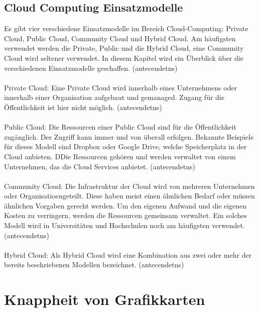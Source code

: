\documentclass[12pt,toc=bib,toc=listof]{scrreprt}
\begin{document}
\section{Cloud Computing Einsatzmodelle} %
\label{sec:Cloud Computing Einsatzmodelle}

Es gibt vier verschiedene Einsatzmodelle im Bereich Cloud-Computing: Private Cloud, Public Cloud, Community Cloud 
und Hybrid Cloud. Am häufigsten verwendet werden die Private, Public und die Hybrid Cloud, eine Community Cloud 
wird seltener verwendet. In diesem Kapitel wird ein Überblick über die verschiedenen Einsatzmodelle geschaffen. (antecendetns)
\\ \\ 
Private Cloud: Eine Private Cloud wird innerhalb eines Unternehmens oder innerhalb einer Organisation aufgebaut 
und gemanaged. Zugang für die Öffentlichkeit ist hier nicht möglich. (antecendetns)
 \\ \\
Public Cloud: Die Ressourcen einer Public Cloud sind für die Öffentlichkeit zugänglich. Der Zugriff kann 
immer und von überall erfolgen. Bekannte Beispiele für dieses Modell sind Dropbox oder Google Drive, welche 
Speicherplatz in der Cloud anbieten.
 DDie Ressourcen gehören und werden verwaltet von einem Unternehmen, das die Cloud Services anbietet. (antecendetns)
 \\ \\ 
Community Cloud: Die Infrastruktur der Cloud wird von mehreren Unternehmen oder Organisatioengeteilt.
 Diese haben meist einen ähnlichen Bedarf oder müssen ähnlichen Vorgaben gerecht werden. Um den eigenen Aufwand 
 und die eigenen Kosten zu verringern, werden die Ressourcen gemeinsam verwaltet. Ein solches Modell wird in 
 Universitäten und Hochschulen noch am häufigsten verwendet. (antecendetns)
\\ \\  
Hybrid Cloud: Als Hybrid Cloud wird eine Kombination aus zwei oder mehr der bereits
 beschriebenen Modellen bezeichnet. (antecendetns)

\chapter{Knappheit von Grafikkarten} %
\label{sec:Knappheit von Grafikkarten}
\end{document}
